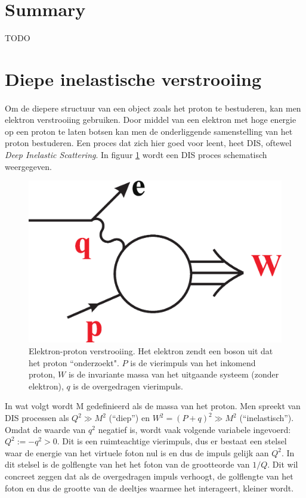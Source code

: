 \documentclass[a4paper,11pt]{article}
\numberwithin{equation}{section} %
\begin{document}
\section*{Summary}
TODO
\thispagestyle{empty}
\newpage

\tableofcontents
\thispagestyle{empty}
\newpage

\section{Diepe inelastische verstrooiing}
      \paragraph{}
Om de diepere structuur van een object zoals het proton te bestuderen, kan men elektron verstrooiing gebruiken.
Door middel van een elektron met hoge energie op een proton te laten botsen kan men de onderliggende samenstelling van het proton bestuderen.
Een proces dat zich hier goed voor leent, heet DIS, oftewel \textit{Deep Inelastic Scattering}. In figuur \ref{fig:DIS} wordt een DIS proces schematisch weergegeven.
\begin{figure} [H]
  \begin{center}
    \includegraphics[width=.33\textwidth]{Afbeeldingen/DIS.eps}
    \caption{Elektron-proton verstrooiing.
Het elektron zendt een boson uit dat het proton “onderzoekt".
$P$ is de vierimpuls van het inkomend proton, $W$ is de invariante massa van het uitgaande systeem (zonder elektron), $q$ is de overgedragen vierimpuls. \cite{Martin}}
   \label{fig:DIS}
  \end{center}
\end{figure}
 In wat volgt wordt M gedefinieerd als de massa van het proton. Men spreekt van DIS processen als $Q^2 \gg M^2$ (“diep”) en $W^2 = (P+q)^2 \gg M^2$ (“inelastisch”).
Omdat de waarde van $q^2$ negatief is, wordt vaak volgende variabele ingevoerd: $Q^2 :=-q^2 > 0$.  Dit is een ruimteachtige vierimpuls, dus er bestaat een stelsel waar de energie van het virtuele foton nul is en dus de impuls gelijk aan $Q^2$. In dit stelsel is de golflengte van het het foton van de grootteorde van $1/Q$.
Dit wil concreet zeggen dat als de overgedragen impuls verhoogt, de golflengte van het foton en dus de grootte van de deeltjes waarmee het interageert, kleiner wordt.
\end{document}
